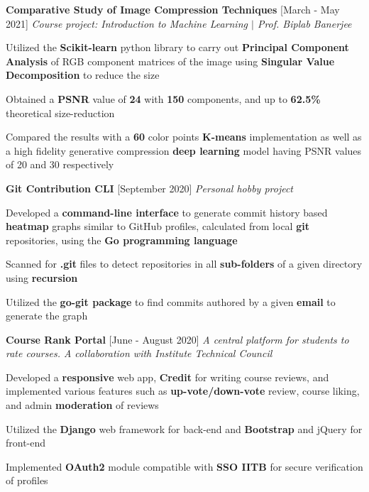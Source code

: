 \documentclass[12pt]{article}
\newcommand{\smallbullet}{
    \small$\bullet$
}
\newcommand{\bigblock}[3]{
    {
        \hspace*{-8pt} \textbf{#1} \hfill #2 \newline
        \textit{#3}
    }
}
\newenvironment{bullet-list-minor}{
    \begin{list}{
        \smallbullet
    }{
        \setlength\leftmargin{30pt}\topsep 0pt \itemsep -3pt
    }
} {
    \end{list}
}
\begin{document}
    \bigblock{
        Comparative Study of Image Compression Techniques
    }{
        [March - May 2021]
    }{
        Course project: Introduction to Machine Learning \(|\) Prof. Biplab Banerjee
    }
	\begin{bullet-list-minor}
        \item Utilized the \textbf{Scikit-learn} python library to carry out \textbf{Principal Component Analysis} of RGB component
        matrices of the image using \textbf{Singular Value Decomposition} to reduce the size
        \item Obtained a \textbf{PSNR} value of \textbf{24} with \textbf{150} components, and up to \textbf{62.5\%} theoretical size-reduction
        \item Compared the results with a \textbf{60} color points \textbf{K-means} implementation as well as a high fidelity generative
        compression \textbf{deep learning} model having PSNR values of 20 and 30 respectively
    \end{bullet-list-minor}

    \bigblock{
        Git Contribution CLI
    }{
        [September 2020]
    }{
        Personal hobby project
    }
	\begin{bullet-list-minor}
        \item Developed a \textbf{command-line interface} to generate commit history based \textbf{heatmap} graphs
        similar to GitHub profiles, calculated from local \textbf{git} repositories, using the \textbf{Go programming language}
        \item Scanned for \textbf{.git} files to detect repositories in all \textbf{sub-folders} of a given directory using \textbf{recursion}
        \item Utilized the \textbf{go-git package} to find commits authored by a given \textbf{email} to generate the graph
    \end{bullet-list-minor}

    \bigblock{
        Course Rank Portal
    }{
        [June - August 2020]
    }{
        A central platform for students to rate courses. A collaboration with Institute Technical Council
    }
	\begin{bullet-list-minor}
        \item Developed a \textbf{responsive} web app, \textbf{Credit} for writing course reviews, and implemented various
        features such as \textbf{up-vote/down-vote} review, course liking, and admin \textbf{moderation} of reviews
        \item Utilized the \textbf{Django} web framework for back-end and \textbf{Bootstrap} and jQuery for front-end
        \item Implemented \textbf{OAuth2} module compatible with \textbf{SSO IITB} for secure verification of profiles
    \end{bullet-list-minor}
\end{document}
